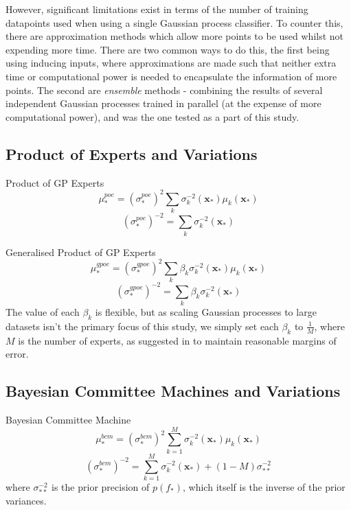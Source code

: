 However, significant limitations exist in terms of the number of training datapoints used when using a single Gaussian process classifier. To counter this, there are approximation methods which allow more points to be used whilst not expending more time. There are two common ways to do this, the first being using inducing inputs, where approximations are made such that neither extra time or computational power is needed to encapsulate the information of more points. The second are \textit{ensemble} methods - combining the results of several independent Gaussian processes trained in parallel (at the expense of more computational power), and was the one tested as a part of this study.

\subsection{Product of Experts and Variations}

Product of GP Experts
\begin{equation}
    \mu_*^{poe} = (\sigma_*^{poe})^2 \sum_k \sigma_k^{-2} (\mathbf{x_*}) \mu_k (\mathbf{x_*})
\end{equation}
\begin{equation}
    (\sigma_*^{poe})^{-2} = \sum_k \sigma_k^{-2} (\mathbf{x_*})
\end{equation}

Generalised Product of GP Experts
\begin{equation}
    \mu_*^{gpoe} = (\sigma_*^{gpoe})^2 \sum_k \beta_k \sigma_k^{-2} (\mathbf{x_*}) \mu_k (\mathbf{x_*})
\end{equation}
\begin{equation}
    (\sigma_*^{gpoe})^{-2} = \sum_k \beta_k \sigma_k^{-2} (\mathbf{x_*})
\end{equation}
The value of each $\beta_k$ is flexible, but as scaling Gaussian processes to large datasets isn't the primary focus of this study, we simply set each $\beta_k$ to $\frac{1}{M}$, where $M$ is the number of experts, as suggested in \citep{deisenroth15} to maintain reasonable margins of error.

\subsection{Bayesian Committee Machines and Variations}

Bayesian Committee Machine
\begin{equation}
    \mu_*^{bcm} = (\sigma_*^{bcm})^2 \sum_{k=1}^M \sigma_k^{-2} (\mathbf{x_*}) \mu_k (\mathbf{x_*})
\end{equation}
\begin{equation}
    (\sigma_*^{bcm})^{-2} = \sum_{k=1}^M \sigma_k^{-2} (\mathbf{x_*}) + (1-M)\sigma_{**}^{-2}
\end{equation}
where $\sigma_{**}^{-2}$ is the prior precision of $p(f_*)$, which itself is the inverse of the prior variances.

